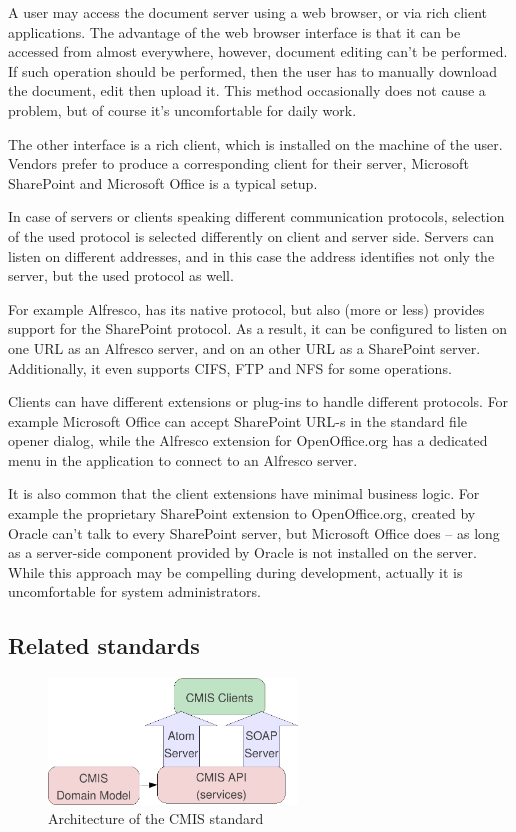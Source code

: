 A user may access the document server using a web browser, or via rich client
applications. The advantage of the web browser interface is that it can be
accessed from almost everywhere, however, document editing can't be performed.
If such operation should be performed, then the user has to manually download
the document, edit then upload it. This method occasionally does not cause a
problem, but of course it's uncomfortable for daily work.

The other interface is a rich client, which is installed on the machine of the
user. Vendors prefer to produce a corresponding client for their server,
Microsoft SharePoint and Microsoft Office is a typical setup.

In case of servers or clients speaking different communication protocols,
selection of the used protocol is selected differently on client and server
side. Servers can listen on different addresses, and in this case the address
identifies not only the server, but the used protocol as well.

For example Alfresco, has its native protocol, but also (more or less) provides
support for the SharePoint protocol. As a result, it can be configured to
listen on one URL as an Alfresco server, and on an other URL as a SharePoint
server. Additionally, it even supports CIFS, FTP and NFS for some
operations.\cite{alfresco-fsc}

Clients can have different extensions or plug-ins to handle different
protocols. For example Microsoft Office can accept SharePoint URL-s in the
standard file opener dialog, while the Alfresco extension for OpenOffice.org
has a dedicated menu in the application to connect to an Alfresco server.

It is also common that the client extensions have minimal business logic. For
example the proprietary SharePoint extension to OpenOffice.org, created by
Oracle can't talk to every SharePoint server, but Microsoft Office does -- as
long as a server-side component provided by Oracle is not installed on the
server. While this approach may be compelling during development, actually it
is uncomfortable for system administrators.

\subsection{Related standards}

\begin{figure}[H]
\centering
\includegraphics[width=250px,keepaspectratio]{cmis.pdf}
\caption{Architecture of the CMIS standard}
\label{fig:cmis}
\end{figure}

